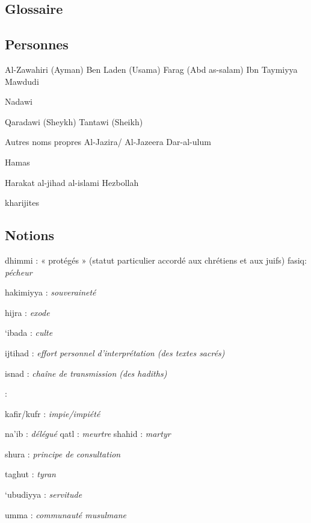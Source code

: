    
  


\hypertarget{glossaire-4}{%
\subsection{\texorpdfstring{{Glossaire}}{Glossaire}}\label{glossaire-4}}

\subsection{Personnes}
{}

Al-Zawahiri (Ayman) Ben Laden (Usama) Farag (Abd as-salam) Ibn Taymiyya
Mawdudi

Nadawi

Qaradawi (Sheykh) Tantawi (Sheikh)

{Autres noms propres} Al-Jazira/ Al-Jazeera Dar-al-ulum

Hamas

Harakat al-jihad al-islami Hezbollah

kharijites

\subsection{Notions}

dhimmi : « protégés » (statut particulier accordé aux chrétiens et aux
juifs) fasiq: \emph{pécheur}



hakimiyya : \emph{souveraineté}

hijra : \emph{exode}

`ibada : \emph{culte}

ijtihad : \emph{effort personnel d'interprétation (des textes sacrés)}

isnad : \emph{chaîne de transmission (des hadiths)} 


 :


kafir/kufr : \emph{impie/impiété}



na'ib : \emph{délégué} qatl : \emph{meurtre} shahid : \emph{martyr}

shura : \emph{principe de consultation}

taghut : \emph{tyran}

`ubudiyya : \emph{servitude}

umma : \emph{communauté musulmane}


